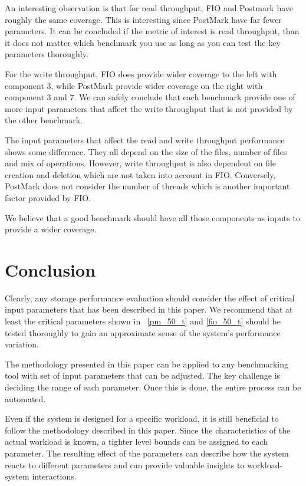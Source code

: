 An interesting observation is that for read throughput, FIO and Postmark have roughly the same coverage. This is interesting since PostMark have far fewer parameters. It can be concluded if the metric of interest is read throughput, than it does not matter which benchmark you use as long as you can test the key parameters thoroughly.

For the write throughput, FIO does provide wider coverage to the left with component 3, while PostMark provide wider coverage on the right with component 3 and 7. We can safely conclude that each benchmark provide one of more input parameters that affect the write throughput that is not provided by the other benchmark. 

The input parameters that affect the read and write throughput performance shows some difference. They all depend on the size of the files, number of files and mix of operations. However, write throughput is also dependent on file creation and deletion which are not taken into account in FIO. Conversely, PostMark does not consider the number of threads which is another important factor provided by FIO. 

We believe that a good benchmark should have all those components as inputs to provide a wider coverage. 

\section{Conclusion}
Clearly, any storage performance evaluation should consider the effect of critical input parameters that has been described in this paper. We recommend that at least the critical parameters shown in \tablename~\ref{pm_50_t} and \ref{fio_50_t} should be tested thoroughly to gain an approximate sense of the system's performance variation.

The methodology presented in this paper can be applied to any benchmarking tool with set of input parameters that can be adjusted. The key challenge is deciding the range of each parameter. Once this is done, the entire process can be automated. 

Even if the system is designed for a specific workload, it is still beneficial to follow the methodology described in this paper. Since the characteristics of the actual workload is known, a tighter level bounds can be assigned to each parameter. The resulting effect of the parameters can describe how the system reacts to different parameters and can provide valuable insights to workload-system interactions. 

